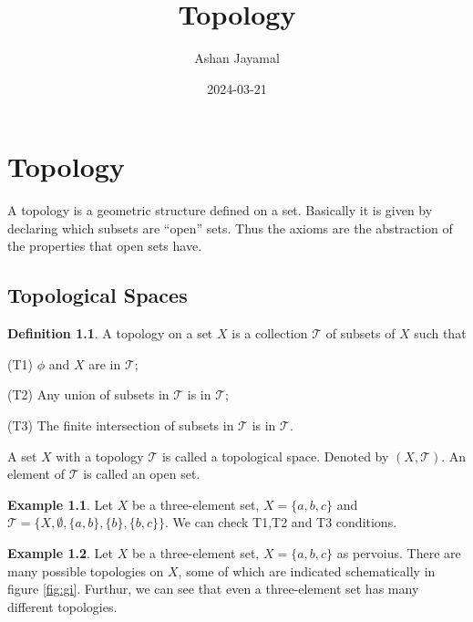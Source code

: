 \documentclass[
]{book}
\title{Topology}
\author{Ashan Jayamal}
\date{2024-03-21}
\theoremstyle{definition}
\newtheorem{definition}{Definition}[chapter]
\theoremstyle{definition}
\newtheorem{example}{Example}[chapter]
\theoremstyle{definition}
\theoremstyle{definition}
\theoremstyle{remark}
\begin{document}
\maketitle

{
\setcounter{tocdepth}{1}
\tableofcontents
}
\hypertarget{topology}{%
\chapter{Topology}\label{topology}}

A topology is a geometric structure defined on a set. Basically it is given by declaring which subsets are ``open'' sets. Thus the axioms are the abstraction of the properties that open sets have.

\hypertarget{topological-spaces}{%
\section{Topological Spaces}\label{topological-spaces}}

\begin{definition}
\protect\hypertarget{def:Top}{}\label{def:Top}A topology on a set \(X\) is a collection \(\mathcal{T}\) of subsets of \(X\) such that

(T1) \(\phi\) and \(X\) are in \(\mathcal{T}\);

(T2) Any union of subsets in \(\mathcal{T}\) is in \(\mathcal{T}\);

(T3) The finite intersection of subsets in \(\mathcal{T}\) is in \(\mathcal{T}\).
\end{definition}

A set \(X\) with a topology \(\mathcal{T}\) is called a topological space. Denoted by \((X,\mathcal{T})\). An element of \(\mathcal{T}\) is called an open set.

\begin{example}
\protect\hypertarget{exm:unnamed-chunk-1}{}\label{exm:unnamed-chunk-1}Let \(X\) be a three-element set, \(X = \{a, b, c\}\) and \(\mathcal{T}=\{X, \emptyset,\{a, b\}, \{b\}, \{b, c\}\}\). We can check T1,T2 and T3 conditions.
\end{example}

\begin{example}
\protect\hypertarget{exm:unnamed-chunk-2}{}\label{exm:unnamed-chunk-2}Let \(X\) be a three-element set, \(X = \{a, b, c\}\) as pervoius. There are many possible topologies on \(X\), some of which are indicated schematically in figure \ref{fig:gi}. Furthur, we can see that even a three-element set has many different topologies.
\end{example}
\end{document}
